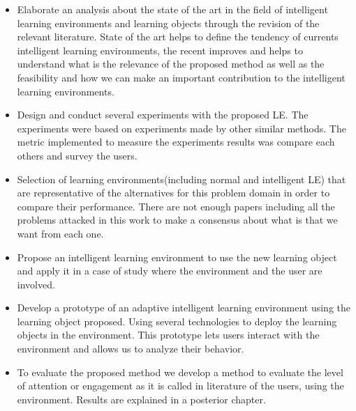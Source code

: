 \begin{itemize}	
\item Elaborate an analysis about the state of the art in the ﬁeld of intelligent learning environments and learning objects through the revision of the relevant literature. State of the art helps to deﬁne the tendency of currents intelligent learning environments, the recent improves and helps to understand what is the relevance of the proposed method as well as the feasibility and how we can make an important contribution to the intelligent learning environments.

\item  Design and conduct several experiments with the proposed LE. The experiments were based on experiments made by other similar methods. The metric implemented to measure the experiments results was compare each others and survey the users. 

\item  Selection of learning environments(including normal and intelligent LE) that are representative of the alternatives for this problem domain in order to compare their performance. There are not enough papers including all the problems attacked in this work to make a consensus about what is that we want from each one.

\item Propose an intelligent learning environment to use the new learning object and apply it in a case of study where the environment and the user are involved. 

\item Develop a prototype of an adaptive intelligent learning environment using the learning object proposed. Using several technologies to deploy the learning objects in the environment. This prototype lets users interact with the environment and allows us to analyze their behavior. 
   
\item To evaluate the proposed method we develop a method to evaluate the level of attention or engagement as it is called in literature of the users, using the environment. Results are explained in a posterior chapter.

\end{itemize}
